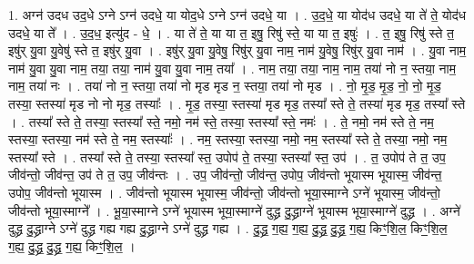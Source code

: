 \documentclass[17pt]{extarticle}
\begin{document}
1. अग्न॑ उदध उद॒धे ऽग्ने ऽग्न॑ उदधे॒ या योद॒धे ऽग्ने ऽग्न॑ उदधे॒ या । . उ॒द॒धे॒ या योद॑ध उदधे॒ या ते॑ ते॒ योद॑ध उदधे॒ या ते᳚ । . उ॒द॒ध॒ इत्यु॑द - धे॒ । . या ते॑ ते॒ या या त॒ इषु॒ रिषु॑ स्ते॒ या या त॒ इषुः॑ । . त॒ इषु॒ रिषु॑ स्ते त॒ इषु॑र् यु॒वा यु॒वेषु॑ स्ते त॒ इषु॑र् यु॒वा । . इषु॑र् यु॒वा यु॒वेषु॒ रिषु॑र् यु॒वा नाम॒ नाम॑ यु॒वेषु॒ रिषु॑र् यु॒वा नाम॑ । . यु॒वा नाम॒ नाम॑ यु॒वा यु॒वा नाम॒ तया॒ तया॒ नाम॑ यु॒वा यु॒वा नाम॒ तया᳚ । . नाम॒ तया॒ तया॒ नाम॒ नाम॒ तया॑ नो न॒ स्तया॒ नाम॒ नाम॒ तया॑ नः । . तया॑ नो न॒ स्तया॒ तया॑ नो मृड मृड न॒ स्तया॒ तया॑ नो मृड । . नो॒ मृ॒ड॒ मृ॒ड॒ नो॒ नो॒ मृ॒ड॒ तस्या॒ स्तस्या॑ मृड नो नो मृड॒ तस्याः᳚ । . मृ॒ड॒ तस्या॒ स्तस्या॑ मृड मृड॒ तस्या᳚ स्ते ते॒ तस्या॑ मृड मृड॒ तस्या᳚ स्ते । . तस्या᳚ स्ते ते॒ तस्या॒ स्तस्या᳚ स्ते॒ नमो॒ नम॑ स्ते॒ तस्या॒ स्तस्या᳚ स्ते॒ नमः॑ । . ते॒ नमो॒ नम॑ स्ते ते॒ नम॒ स्तस्या॒ स्तस्या॒ नम॑ स्ते ते॒ नम॒ स्तस्याः᳚ । . नम॒ स्तस्या॒ स्तस्या॒ नमो॒ नम॒ स्तस्या᳚ स्ते ते॒ तस्या॒ नमो॒ नम॒ स्तस्या᳚ स्ते । . तस्या᳚ स्ते ते॒ तस्या॒ स्तस्या᳚ स्त॒ उपोप॑ ते॒ तस्या॒ स्तस्या᳚ स्त॒ उप॑ । . त॒ उपोप॑ ते त॒ उप॒ जीव॑न्तो॒ जीव॑न्त॒ उप॑ ते त॒ उप॒ जीव॑न्तः । . उप॒ जीव॑न्तो॒ जीव॑न्त॒ उपोप॒ जीव॑न्तो भूयास्म भूयास्म॒ जीव॑न्त॒ उपोप॒ जीव॑न्तो भूयास्म । . जीव॑न्तो भूयास्म भूयास्म॒ जीव॑न्तो॒ जीव॑न्तो भूया॒स्माग्ने ऽग्ने॑ भूयास्म॒ जीव॑न्तो॒ जीव॑न्तो भूया॒स्माग्ने᳚ । . भू॒या॒स्माग्ने ऽग्ने॑ भूयास्म भूया॒स्माग्ने॑ दुद्ध्र दु॒द्ध्राग्ने॑ भूयास्म भूया॒स्माग्ने॑ दुद्ध्र । . अग्ने॑ दुद्ध्र दु॒द्ध्राग्ने ऽग्ने॑ दुद्ध्र गह्य गह्य दु॒द्ध्राग्ने ऽग्ने॑ दुद्ध्र गह्य । . दु॒द्ध्र॒ ग॒ह्य॒ ग॒ह्य॒ दु॒द्ध्र॒ दु॒द्ध्र॒ ग॒ह्य॒ किꣳ॒॒शि॒ल॒ किꣳ॒॒शि॒ल॒ ग॒ह्य॒ दु॒द्ध्र॒ दु॒द्ध्र॒ ग॒ह्य॒ किꣳ॒॒शि॒ल॒ । \newline
\end{document}
